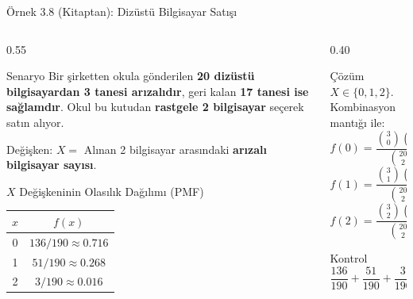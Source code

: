 ﻿\documentclass[light]{lutbeamer}
\begin{document}
\begin{frame}{Örnek 3.8 (Kitaptan): Dizüstü Bilgisayar Satışı}
\footnotesize
\begin{columns}[T]
  \begin{column}{0.55\textwidth}
\begin{block}{Senaryo}
  Bir şirketten okula gönderilen \textbf{20 dizüstü bilgisayardan 3 tanesi arızalıdır},
  geri kalan \textbf{17 tanesi ise sağlamdır}. Okul bu kutudan
  \textbf{rastgele 2 bilgisayar} seçerek satın alıyor.
  
  \vspace{0.15cm}
  Değişken: $X =$ Alınan 2 bilgisayar arasındaki \textbf{arızalı bilgisayar sayısı}.
\end{block}

    \begin{block}{$X$ Değişkeninin Olasılık Dağılımı (PMF)}
      \centering
      \begin{tabular}{cc}
        \toprule
        $x$ & $f(x)$ \\
        \midrule
        0 & $136/190 \approx 0.716$ \\
        1 & $51/190 \approx 0.268$ \\
        2 & $3/190 \approx 0.016$ \\
        \bottomrule
      \end{tabular}
    \end{block}

  \end{column}
  \begin{column}{0.40\textwidth}
    \begin{alertblock}{Çözüm}
      $X \in \{0, 1, 2\}$. Kombinasyon mantığı ile:
      \[
      f(0) = \frac{\binom{3}{0}\binom{17}{2}}{\binom{20}{2}} = \frac{136}{190}
      \]
      \[
      f(1) = \frac{\binom{3}{1}\binom{17}{1}}{\binom{20}{2}} = \frac{51}{190}
      \]
      \[
      f(2) = \frac{\binom{3}{2}\binom{17}{0}}{\binom{20}{2}} = \frac{3}{190}
      \]
    \end{alertblock}

    \begin{block}{Kontrol}
      \[
      \frac{136}{190} + \frac{51}{190} + \frac{3}{190} = \frac{190}{190} = 1 \;\checkmark
      \]
    \end{block}
  \end{column}
\end{columns}
\end{frame}
\end{document}
